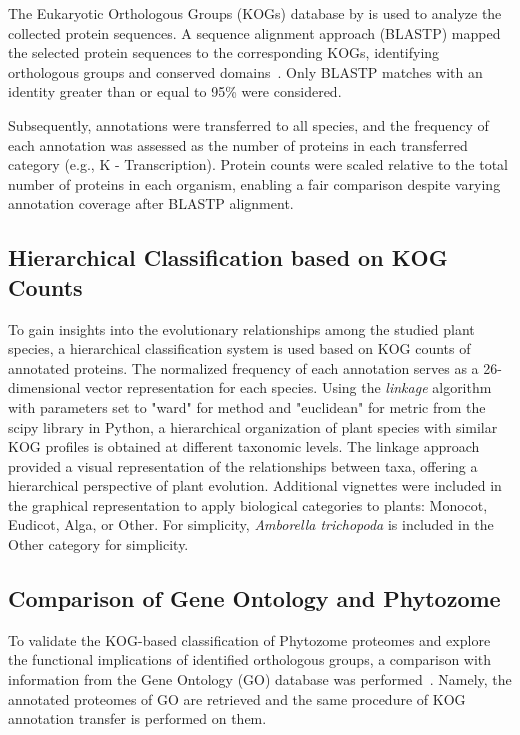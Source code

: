 The Eukaryotic Orthologous Groups (KOGs) database by 
\cite{tatusov2003} is used to analyze the collected protein 
sequences. A sequence alignment approach (BLASTP) mapped the 
selected protein sequences to the corresponding KOGs, 
identifying orthologous groups and conserved 
domains~\citep{camacho2009}. Only BLASTP matches with an 
identity greater than or equal to 95\% were considered.

Subsequently, annotations were transferred to all species, 
and the frequency of each annotation was assessed as the 
number of proteins in each transferred category (e.g., K - 
Transcription). Protein counts were scaled relative to the 
total number of proteins in each organism, enabling a 
fair comparison despite varying annotation coverage after 
BLASTP alignment.


\subsection{Hierarchical Classification based on KOG Counts}
\label{sec:method.hierarchy}

To gain insights into the evolutionary relationships among 
the studied plant species, a hierarchical classification 
system is used based on KOG counts of annotated proteins. 
The normalized frequency of each annotation serves as a 
26-dimensional vector representation for each species. Using 
the \emph{linkage} algorithm with parameters set to "ward" 
for method and "euclidean" for metric from the scipy library 
in Python, a hierarchical organization of plant species with 
similar KOG profiles is obtained at different taxonomic 
levels. The linkage approach provided a visual representation 
of the relationships between taxa, offering a hierarchical 
perspective of plant evolution. Additional vignettes were 
included in the graphical representation to apply biological 
categories to plants: Monocot, Eudicot, Alga, or Other. 
For simplicity, \emph{Amborella trichopoda} is included in 
the Other category for simplicity.


\subsection{Comparison of Gene Ontology and Phytozome}
\label{sec:method.compare}

To validate the KOG-based classification of Phytozome proteomes 
and explore the functional implications of identified 
orthologous groups, a 
comparison with information from the Gene Ontology (GO) 
database was performed~\citep{ashburner2000,consortium2023}.
Namely, the annotated proteomes of GO are retrieved and the 
same procedure of KOG annotation transfer is performed on them.

